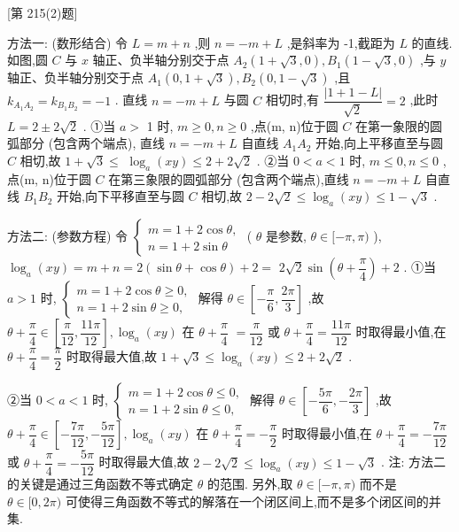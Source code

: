 [第 215(2)题]

方法一: (数形结合) 令 $L = m + n$ ,则 $n =  - m + L$ ,是斜率为 -1,截距为 $L$ 的直线. 如图,圆 $C$ 与 $x$ 轴正、负半轴分别交于点 ${A}_{2}\left( {1 + \sqrt{3},0}\right) ,{B}_{1}\left( {1 - \sqrt{3},0}\right)$ ,与 $y$ 轴正、负半轴分别交于点 ${A}_{1}\left( {0,1 + \sqrt{3}}\right) ,{B}_{2}\left( {0,1 - \sqrt{3}}\right)$ ,且 ${k}_{{A}_{1}{A}_{2}} = {k}_{{B}_{1}{B}_{2}} =  - 1$ . 直线 $n =  - m + L$ 与圆 $C$ 相切时,有 $\dfrac{\left| 1 + 1 - L\right| }{\sqrt{2}} = 2$ ,此时 $L = 2 \pm  2\sqrt{2}$ . ①当 $a >$ 1 时, $m \geq  0,n \geq  0$ ,点(m, n)位于圆 $C$ 在第一象限的圆弧部分 (包含两个端点), 直线 $n =  - m + L$ 自直线 ${A}_{1}{A}_{2}$ 开始,向上平移直至与圆 $C$ 相切,故 $1 + \sqrt{3} \leq$  ${\log }_{a}\left( {xy}\right)  \leq  2 + 2\sqrt{2}$ . ②当 $0 < a < 1$ 时, $m \leq  0,n \leq  0$ ,点(m, n)位于圆 $C$ 在第三象限的圆弧部分 (包含两个端点),直线 $n =  - m + L$ 自直线 ${B}_{1}{B}_{2}$ 开始,向下平移直至与圆 $C$ 相切,故 $2 - 2\sqrt{2} \leq  {\log }_{a}\left( {xy}\right)  \leq  1 - \sqrt{3}$ .

方法二: (参数方程) 令 $\left\{  \begin{array}{l} m = 1 + 2\cos \theta , \\  n = 1 + 2\sin \theta  \end{array}\right.$ ( $\theta$ 是参数, $\theta  \in  \lbrack  - \pi ,\pi )$ ), ${\log }_{a}\left( {xy}\right)  = m + n = 2\left( {\sin \theta  + \cos \theta }\right)  + 2 =$  $2\sqrt{2}\sin \left( {\theta  + \dfrac{\pi }{4}}\right)  + 2$ . ①当 $a > 1$ 时, $\left\{  \begin{array}{l} m = 1 + 2\cos \theta  \geq  0, \\  n = 1 + 2\sin \theta  \geq  0, \end{array}\right.$ 解得 $\theta  \in  \left\lbrack  {-\dfrac{\pi }{6},\dfrac{2\pi }{3}}\right\rbrack$ ,故 $\theta  + \dfrac{\pi }{4} \in  \left\lbrack  {\dfrac{\pi }{12},\dfrac{11\pi }{12}}\right\rbrack  ,{\log }_{a}\left( {xy}\right)$ 在 $\theta  + \dfrac{\pi }{4}$  $= \dfrac{\pi }{12}$ 或 $\theta  + \dfrac{\pi }{4} = \dfrac{11\pi }{12}$ 时取得最小值,在 $\theta  + \dfrac{\pi }{4} = \dfrac{\pi }{2}$ 时取得最大值,故 $1 + \sqrt{3} \leq  {\log }_{a}\left( {xy}\right)  \leq  2 + 2\sqrt{2}$ .

②当 $0 < a < 1$ 时, $\left\{  \begin{array}{l} m = 1 + 2\cos \theta  \leq  0, \\  n = 1 + 2\sin \theta  \leq  0, \end{array}\right.$ 解得 $\theta  \in  \left\lbrack  {-\dfrac{5\pi }{6}, - \dfrac{2\pi }{3}}\right\rbrack$ ,故 $\theta  + \dfrac{\pi }{4} \in  \left\lbrack  {-\dfrac{7\pi }{12}, - \dfrac{5\pi }{12}}\right\rbrack  ,{\log }_{a}\left( {xy}\right)$ 在 $\theta  + \dfrac{\pi }{4} =  - \dfrac{\pi }{2}$ 时取得最小值,在 $\theta  + \dfrac{\pi }{4} =  - \dfrac{7\pi }{12}$ 或 $\theta  + \dfrac{\pi }{4} =  - \dfrac{5\pi }{12}$ 时取得最大值,故 $2 - 2\sqrt{2} \leq  {\log }_{a}\left( {xy}\right)  \leq  1 - \sqrt{3}$ . 注: 方法二的关键是通过三角函数不等式确定 $\theta$ 的范围. 另外,取 $\theta  \in  \lbrack  - \pi ,\pi )$ 而不是 $\theta  \in  \lbrack 0,{2\pi })$ 可使得三角函数不等式的解落在一个闭区间上,而不是多个闭区间的并集.

